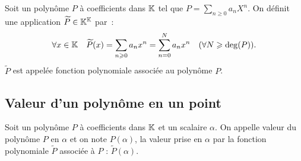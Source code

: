 \begin{defdef}
  Soit un polynôme \(P\) à coefficients dans \(\mathbb{K}\) tel que \(P=\sum_{n 
  \geqslant 0}a_n X^n\). On définit une application \(\widetilde{P} \in \mathbb{K}^{\mathbb{K}}\) 
  par~:
  \begin{equation}
    \forall x \in \mathbb{K} \quad \widetilde{P}(x) = \sum_{n \geqslant 0} a_n 
    x^n=\sum_{n=0}^N a_n x^n \quad (\forall N \geqslant \deg(P)).
  \end{equation}
  \(\widetilde{P}\) est appelée fonction polynomiale associée au polynôme \(P\).
\end{defdef}

\subsection{Valeur d'un polynôme en un point}

\begin{defdef}
  Soit un polynôme \(P\) à coefficients dans \(\mathbb{K}\) et un scalaire \(\alpha\). 
  On appelle valeur du polynôme \(P\) en \(\alpha\) et on note \(P(\alpha)\), la 
  valeur prise en \(\alpha\) par la fonction polynomiale \(\widetilde{P}\) 
  associée à \(P\) : \(\widetilde{P}(\alpha)\).
\end{defdef}

